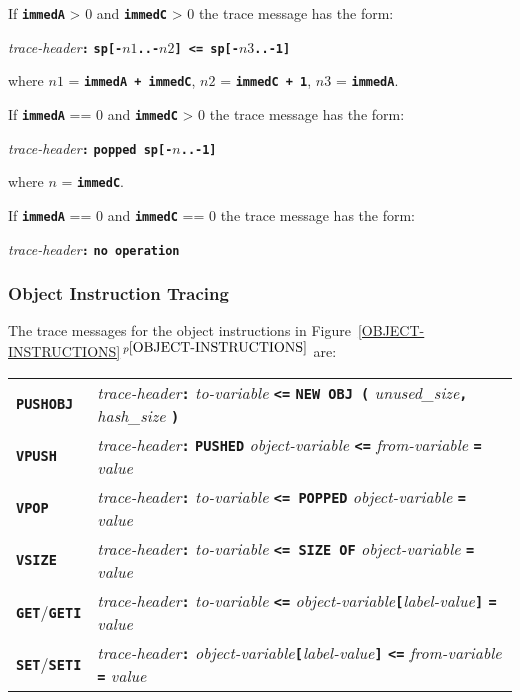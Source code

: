 \documentclass[12pt]{article}
\newcommand{\TT}[1]{{\tt \bfseries #1}}
\newcommand{\itemref}[1]{\ref{#1}$\,^{p\pageref{#1}}$}
\begin{document}
If \TT{immedA} > 0 and \TT{immedC} > 0 the trace message has the form:
\begin{center}
{\em trace-header}\TT{:} \TT{sp[-$n1$..-$n2$] <= sp[-$n3$..-1]}
\end{center}
where $n1$ = \TT{immedA + immedC}, $n2$ = \TT{immedC + 1},
$n3$ = \TT{immedA}.

If \TT{immedA} == 0 and \TT{immedC} > 0 the trace message has the form:
\begin{center}
{\em trace-header}\TT{:} \TT{popped sp[-$n$..-1]}
\end{center}
where $n$ = \TT{immedC}.

If \TT{immedA} == 0 and \TT{immedC} == 0 the trace message has the form:
\begin{center}
{\em trace-header}\TT{:} \TT{no operation}
\end{center}

\subsubsection{Object Instruction Tracing}
\label{OBJECT-INSTRUCTION-TRACING}

The trace messages for the object instructions in
Figure~\itemref{OBJECT-INSTRUCTIONS} are:
\begin{center}
\begin{tabular}{l@{~~~~~}l}
\TT{PUSHOBJ} &
{\em trace-header}\TT{:} {\em to-variable}
                    \TT{<=} \TT{NEW OBJ (} {\em unused\_size}\TT{,}
		    {\em hash\_size} \TT{)}
\\[1ex]
\TT{VPUSH} &
{\em trace-header}\TT{:} \TT{PUSHED} {\em object-variable}
                    \TT{<=} {\em from-variable}
		    \TT{=} {\em value}
\\[1ex]
\TT{VPOP} &
{\em trace-header}\TT{:} {\em to-variable}
                    \TT{<= POPPED} {\em object-variable}
		    \TT{=} {\em value}
\\[1ex]
\TT{VSIZE} &
{\em trace-header}\TT{:} {\em to-variable}
                    \TT{<= SIZE OF} {\em object-variable}
		    \TT{=} {\em value}
\\[1ex]
\TT{GET}/\TT{GETI} &
{\em trace-header}\TT{:} {\em to-variable}
                    \TT{<=} {\em object-variable}\TT{[}{\em label-value}\TT{]}
		    \TT{=} {\em value}
\\[1ex]
\TT{SET}/\TT{SETI} &
{\em trace-header}\TT{:} {\em object-variable}\TT{[}{\em label-value}\TT{]}
		    \TT{<=} {\em from-variable} \TT{=} {\em value}
\end{tabular}
\end{center}
\end{document}
